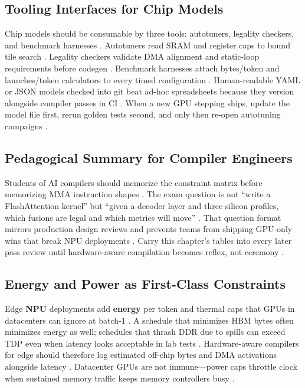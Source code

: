 \subsection{Tooling Interfaces for Chip Models}
\label{sec:ch03_tooling}

Chip models should be consumable by three tools: autotuners, legality checkers, and benchmark harnesses \citep{patel2025llminference,memoryfloor2026}.
Autotuners read SRAM and register caps to bound tile search \citep{nvidia2022hopper,amd2024xdna}.
Legality checkers validate DMA alignment and static-loop requirements before codegen \citep{amd2024aie}.
Benchmark harnesses attach bytes/token and launches/token calculators to every timed configuration \citep{taxbreak2026,memoryfloor2026}.
Human-readable YAML or JSON models checked into git beat ad-hoc spreadsheets because they version alongside compiler passes in CI \citep{dlbook}.
When a new GPU stepping ships, update the model file first, rerun golden tests second, and only then re-open autotuning campaigns \citep{nvidia2022hopper,semianalysis2024tma}.

\subsection{Pedagogical Summary for Compiler Engineers}
\label{sec:ch03_pedagogy}

Students of AI compilers should memorize the constraint matrix before memorizing MMA instruction shapes \citep{dlbook,nvidia2022hopper}.
The exam question is not ``write a FlashAttention kernel'' but ``given a decoder layer and three silicon profiles, which fusions are legal and which metrics will move'' \citep{patel2025llminference,memoryfloor2026,amd2024xdna}.
That question format mirrors production design reviews and prevents teams from shipping GPU-only wins that break NPU deployments \citep{amd2024xdna,patel2025llminference}.
Carry this chapter's tables into every later pass review until hardware-aware compilation becomes reflex, not ceremony \citep{memoryfloor2026,taxbreak2026,liu2024deepseekv3}.

\subsection{Energy and Power as First-Class Constraints}
\label{sec:ch03_energy}

Edge \textbf{NPU} deployments add \textbf{energy} per token and thermal caps that GPUs in datacenters can ignore at batch-1 \citep{amd2024xdna,memoryfloor2026}.
A schedule that minimizes HBM bytes often minimizes energy as well; schedules that thrash DDR due to spills can exceed TDP even when latency looks acceptable in lab tests \citep{patel2025llminference,amd2024aie}.
Hardware-aware compilers for edge should therefore log estimated off-chip bytes and DMA activations alongside latency \citep{amd2024xdna,memoryfloor2026}.
Datacenter GPUs are not immune---power caps throttle clock when sustained memory traffic keeps memory controllers busy \citep{memoryfloor2026,nvidia2022hopper}.

